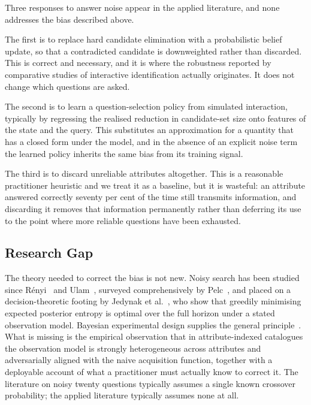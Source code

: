 \documentclass[conference]{IEEEtran}
\begin{document}
Three responses to answer noise appear in the applied literature, and none
addresses the bias described above.

The first is to replace hard candidate elimination with a probabilistic belief
update, so that a contradicted candidate is downweighted rather than discarded.
This is correct and necessary, and it is where the robustness reported by
comparative studies of interactive identification actually originates. It does
not change which questions are asked.

The second is to learn a question-selection policy from simulated interaction,
typically by regressing the realised reduction in candidate-set size onto
features of the state and the query. This substitutes an approximation for a
quantity that has a closed form under the model, and in the absence of an
explicit noise term the learned policy inherits the same bias from its training
signal.

The third is to discard unreliable attributes altogether. This is a reasonable
practitioner heuristic and we treat it as a baseline, but it is wasteful: an
attribute answered correctly seventy per cent of the time still transmits
information, and discarding it removes that information permanently rather than
deferring its use to the point where more reliable questions have been
exhausted.

\subsection{Research Gap}

The theory needed to correct the bias is not new. Noisy search has been studied
since R\'enyi~\cite{renyi1961} and Ulam~\cite{ulam1976}, surveyed
comprehensively by Pelc~\cite{pelc2002}, and placed on a decision-theoretic
footing by Jedynak et al.~\cite{jedynak2012}, who show that greedily minimising
expected posterior entropy is optimal over the full horizon under a stated
observation model. Bayesian experimental design supplies the general
principle~\cite{lindley1956,chaloner1995}. What is missing is the empirical
observation that in attribute-indexed catalogues the observation model is
strongly heterogeneous across attributes and adversarially aligned with the
naive acquisition function, together with a deployable account of what a
practitioner must actually know to correct it. The literature on noisy twenty
questions typically assumes a single known crossover probability; the applied
literature typically assumes none at all.
\end{document}
